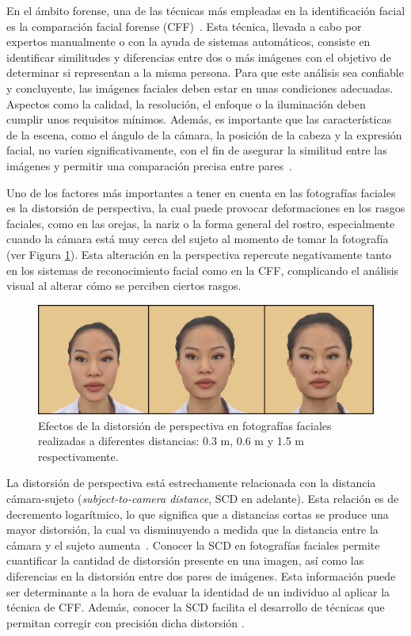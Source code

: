En el ámbito forense, una de las técnicas más empleadas en la identificación facial es la comparación facial forense (CFF)~\cite{3}. Esta técnica, llevada a cabo por expertos manualmente o con la ayuda de sistemas automáticos, consiste en identificar similitudes y diferencias entre dos o más imágenes con el objetivo de determinar si representan a la misma persona. 
Para que este análisis sea confiable y concluyente, las imágenes faciales deben estar en unas condiciones adecuadas. Aspectos como la calidad, la resolución, el enfoque o la iluminación deben cumplir unos requisitos mínimos. Además, es importante que las características de la escena, como el ángulo de la cámara, la posición de la cabeza y la expresión facial, no varíen significativamente, con el fin de asegurar la similitud entre las imágenes y permitir una comparación precisa entre pares~\cite{1,2}.

Uno de los factores más importantes a tener en cuenta en las fotografías faciales es la distorsión de perspectiva, la cual puede provocar deformaciones en los rasgos faciales, como en las orejas, la nariz o la forma general del rostro, especialmente cuando la cámara está muy cerca del sujeto al momento de tomar la fotografía~\cite{12} (ver Figura \ref{fig2}). 
Esta alteración en la perspectiva repercute negativamente tanto en los sistemas de reconocimiento facial como en la CFF, complicando el análisis visual al alterar cómo se perciben ciertos rasgos.

\begin{figure}[h]
	\centering
	\includegraphics[scale=0.25]{imagenes/cap1/scd_distorsion.png}
	\caption[Efectos de la distorsión de perspectiva en fotografías faciales.]{Efectos de la distorsión de perspectiva en fotografías faciales realizadas a diferentes distancias: 0.3 m, 0.6 m y 1.5 m respectivamente.}
	\label{fig2}
\end{figure}

La distorsión de perspectiva está estrechamente relacionada con la distancia cámara-sujeto (\textit{subject-to-camera distance}, SCD en adelante). Esta relación es de decremento logarítmico, lo que significa que a distancias cortas se produce una mayor distorsión, la cual va disminuyendo a medida que la distancia entre la cámara y el sujeto aumenta~\cite{55}. Conocer la SCD en fotografías faciales permite cuantificar la cantidad de distorsión presente en una imagen, así como las diferencias en la distorsión entre dos pares de imágenes. Esta información puede ser determinante a la hora de evaluar la identidad de un individuo al aplicar la técnica de CFF. Además, conocer la SCD facilita el desarrollo de técnicas que permitan corregir con precisión dicha distorsión \cite{16}.

